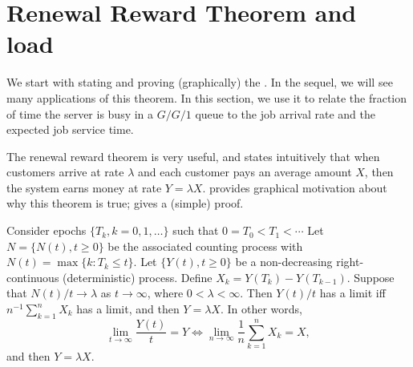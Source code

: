 \section{Renewal Reward Theorem and load}
\label{sec:renew-reward-theor}



We start with stating and proving (graphically) the .
In the sequel, we will see many applications of this theorem.
In this section, we use it to relate the fraction of time the server is busy in a $G/G/1$ queue to the job arrival rate and the expected job service time.


The renewal reward theorem is very useful, and states intuitively that when customers arrive at rate $\lambda$ and each customer pays an average amount $X$, then the system earns money at rate $Y=\lambda X$.
 provides graphical motivation about why this theorem is true; \citet{el-taha98:_sampl_path_analy_queuein_system} gives a (simple) proof.

\begin{theorem}[Renewal Reward Theorem, $Y=\lambda X$]
 Consider epochs $\{T_k, k=0, 1, \ldots\}$ such that $0=T_0 < T_1 < \cdots$
 Let $N=\{N(t), t\geq 0\}$ be the associated counting process with $N(t) = \max\{k : T_k \leq t\}$.
 Let $\{Y(t), t\geq 0\}$ be a non-decreasing right-continuous (deterministic) process.
 Define $X_k = Y(T_k)-Y(T_{k-1})$.
 Suppose that $N(t)/t\to\lambda$ as $t\to\infty$, where $0<\lambda < \infty$.
 Then $Y(t)/t$ has a limit iff $n^{-1}\sum_{k=1}^n X_k$ has a limit, and then $Y=\lambda X$. In other words, 
 \begin{equation*}
 \lim_{t \to \infty} \frac{Y(t)}t=Y \iff \lim_{n \to \infty} \frac 1n\sum_{k=1}^n X_k = X, 
 \end{equation*}
and then $Y=\lambda X$. 
\end{theorem}



